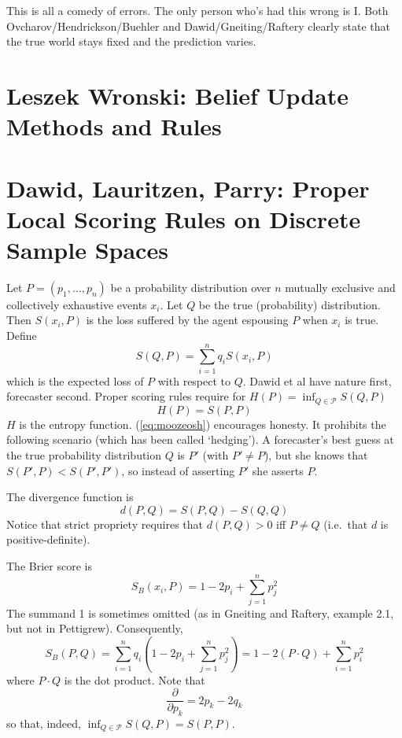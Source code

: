 \documentclass[12pt]{article}
\begin{document}
This is all a comedy of errors. The only person who's had this wrong
is I. Both Ovcharov/Hendrickson/Buehler and Dawid/Gneiting/Raftery
clearly state that the true world stays fixed and the prediction
varies. 

\section{Leszek Wronski: Belief Update Methods and Rules}
\label{section:wiebahyu}

\section{Dawid, Lauritzen, Parry: Proper Local Scoring Rules on
  Discrete Sample Spaces}
\label{section:ahtiesei}

Let $P=(p_{1},{\ldots},p_{n})$ be a probability distribution over $n$
mutually exclusive and collectively exhaustive events $x_{i}$. Let $Q$
be the true (probability) distribution. Then $S(x_{i},P)$ is the loss
suffered by the agent espousing $P$ when $x_{i}$ is true. Define
\begin{equation}
  \label{eq:nahcaece}
  S(Q,P)=\sum_{i=1}^{n}q_{i}S(x_{i},P)
\end{equation}
which is the expected loss of $P$ with respect to $Q$. Dawid et al
have nature first, forecaster second. Proper scoring rules require for
$H(P)=\inf_{Q\in\mathcal{P}}S(Q,P)$
\begin{equation}
  \label{eq:moozeosh}
  H(P)=S(P,P)
\end{equation}
$H$ is the entropy function. (\ref{eq:moozeosh}) encourages honesty.
It prohibits the following scenario (which has been called `hedging').
A forecaster's best guess at the true probability distribution $Q$ is
$P'$ (with $P'\neq{}P$), but she knows that $S(P',P)<S(P',P')$, so
instead of asserting $P'$ she asserts $P$.

The divergence function is
\begin{equation}
  \label{eq:cienaeyo}
  d(P,Q)=S(P,Q)-S(Q,Q)
\end{equation}
Notice that strict propriety requires that $d(P,Q)>0$ iff $P\neq{}Q$
(i.e.\ that $d$ is positive-definite). 

The Brier score is
\begin{equation}
  \label{eq:xoophoot}
  S_{B}(x_{i},P)=1-2p_{i}+\sum_{j=1}^{n}p_{j}^{2}
\end{equation}
The summand 1 is sometimes omitted (as in Gneiting and Raftery,
example 2.1, but not in Pettigrew). Consequently,
\begin{equation}
  \label{eq:phiengae}
  S_{B}(P,Q)=\sum_{i=1}^{n}q_{i}\left(1-2p_{i}+\sum_{j=1}^{n}p_{j}^{2}\right)=1-2(P\cdot{}Q)+\sum_{i=1}^{n}p_{i}^{2}
\end{equation}
where $P\cdot{}Q$ is the dot product. Note that
\begin{equation}
  \label{eq:thequaev}
  \frac{\partial}{\partial{}p_{k}}=2p_{k}-2q_{k}
\end{equation}
so that, indeed, $\inf_{Q\in\mathcal{P}}S(Q,P)=S(P,P)$.
\end{document}
